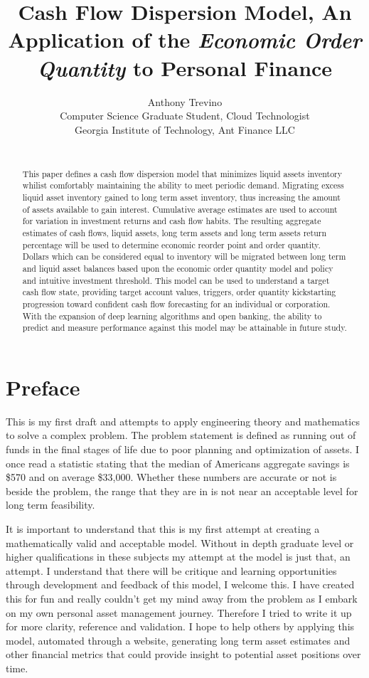 \documentclass{article}
\title{Cash Flow Dispersion Model,  An Application of the \emph{Economic Order Quantity} to Personal Finance}
\author{\hspace{1mm}Anthony Trevino\\
	Computer Science Graduate Student, Cloud Technologist\\
	Georgia Institute of Technology, Ant Finance LLC\\
	\text{trevino293@gmail.com} \\
}
\begin{document}
\maketitle

\begin{abstract}

This paper defines a cash flow dispersion model that minimizes liquid assets inventory whilist comfortably maintaining the ability to meet periodic demand. Migrating excess liquid asset inventory gained to long term asset inventory, thus increasing the amount of assets available to gain interest. Cumulative average estimates are used to account for variation in investment returns and cash flow habits. The resulting aggregate estimates of cash flows, liquid assets, long term assets and long term assets return percentage will be used to determine economic reorder point and order quantity. Dollars which can be considered equal to inventory will be migrated between long term and liquid asset balances based upon the economic order quantity model and policy and intuitive investment threshold. This model can be used to understand a target cash flow state, providing target account values, triggers, order quantity kickstarting progression toward confident cash flow forecasting for an individual or corporation. With the expansion of deep learning algorithms and open banking, the ability to predict and measure performance against this model may be attainable in future study. 

\end{abstract}



\section{Preface}
This is my first draft and attempts to apply engineering theory and mathematics to solve a complex problem. The problem statement is defined as running out of funds in the final stages of life due to poor planning and optimization of assets. I once read a statistic stating that the median of Americans aggregate savings is \$570 and on average \$33,000. Whether these numbers are accurate or not is beside the problem, the range that they are in is not near an acceptable level for long term feasibility.

It is important to understand that this is my first attempt at creating a mathematically valid and acceptable model. Without in depth graduate level or higher qualifications in these subjects my attempt at the model is just that, an attempt. I understand that there will be critique and learning opportunities through development and feedback of this model, I welcome this. I have created this for fun and really couldn't get my mind away from the problem as I embark on my own personal asset management journey. Therefore I tried to write it up for more clarity, reference and validation. I hope to help others by applying this model, automated through a website, generating long term asset estimates and other financial metrics that could provide insight to potential asset positions over time.
\end{document}
